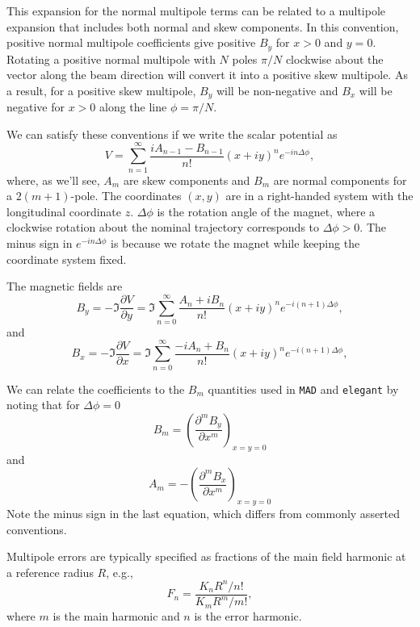 \documentclass[11pt]{article}
\begin{document}
This expansion for the normal multipole terms can be related to a multipole expansion that includes both normal and skew components.
In this convention, positive normal multipole coefficients give positive $B_y$
for $x>0$ and $y=0$. 
Rotating a positive normal multipole with $N$ poles $\pi/N$ clockwise about the vector along
the beam direction will convert it into a positive skew multipole.
As a result, for a positive skew multipole, $B_y$ will be non-negative and $B_x$ will be negative 
for $x>0$ along the line $\phi=\pi/N$.

We can satisfy these conventions if we write the scalar potential as
\begin{equation}\label{equ:potential}
V = \sum_{n=1}^{\infty} \frac{i A_{n-1} - B_{n-1}}{n!} (x + i y)^n e^{-in\Delta\phi},
\end{equation}
where, as we'll see, $A_m$ are skew components and $B_m$ are normal components for
a $2(m+1)$-pole.
The coordinates $(x, y)$ are in a right-handed system with the longitudinal coordinate $z$.
$\Delta\phi$ is the rotation angle of the magnet, where a clockwise rotation 
about the nominal trajectory corresponds to $\Delta\phi>0$.
The minus sign in $e^{-in\Delta\phi}$ is because we rotate the magnet while keeping the
coordinate system fixed.

The magnetic fields are 
\begin{equation} \label{equ:ByFull}
B_y = -\Im \frac{\partial V}{\partial y} =\Im \sum_{n=0}^\infty \frac{A_n + i B_n}{n!}(x+iy)^n e^{-i(n+1)\Delta\phi},
\end{equation}
and
\begin{equation} \label{equ:BxFull}
B_x = -\Im \frac{\partial V}{\partial x} =\Im \sum_{n=0}^\infty \frac{-iA_n + B_n}{n!}(x+iy)^n e^{-i(n+1)\Delta\phi},
\end{equation}

We can relate the coefficients to the $B_m$ quantities used in {\tt MAD} and {\tt elegant} by noting that
for $\Delta\phi=0$
\begin{equation}
B_m = \left(\frac{\partial^m B_y}{\partial x^m}\right)_{x=y=0} 
\end{equation}
and
\begin{equation}\label{equ:oddSign}
A_m = -\left(\frac{\partial^m B_x}{\partial x^m}\right)_{x=y=0}
\end{equation}
Note the minus sign in the last equation, which differs from commonly asserted conventions.

Multipole errors are typically specified as fractions of the main field harmonic at a reference radius $R$,
e.g., 
\begin{equation}
F_n  = \frac{K_n R^n / n!}{K_m R^m / m!},
\end{equation}
where $m$ is the main harmonic and $n$ is the error harmonic.
\end{document}
